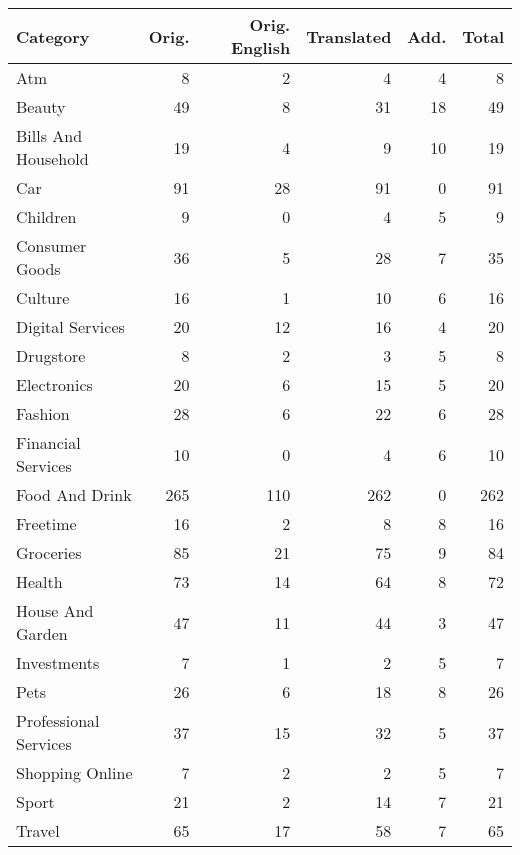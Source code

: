\begin{tabular}{lrrrrr}
\toprule
             Category &  Orig. &  Orig. English &  Translated &  Add. &  Total \\
\midrule
                  Atm &      8 &              2 &           4 &     4 &      8 \\
               Beauty &     49 &              8 &          31 &    18 &     49 \\
  Bills And Household &     19 &              4 &           9 &    10 &     19 \\
                  Car &     91 &             28 &          91 &     0 &     91 \\
             Children &      9 &              0 &           4 &     5 &      9 \\
       Consumer Goods &     36 &              5 &          28 &     7 &     35 \\
              Culture &     16 &              1 &          10 &     6 &     16 \\
     Digital Services &     20 &             12 &          16 &     4 &     20 \\
            Drugstore &      8 &              2 &           3 &     5 &      8 \\
          Electronics &     20 &              6 &          15 &     5 &     20 \\
              Fashion &     28 &              6 &          22 &     6 &     28 \\
   Financial Services &     10 &              0 &           4 &     6 &     10 \\
       Food And Drink &    265 &            110 &         262 &     0 &    262 \\
             Freetime &     16 &              2 &           8 &     8 &     16 \\
            Groceries &     85 &             21 &          75 &     9 &     84 \\
               Health &     73 &             14 &          64 &     8 &     72 \\
     House And Garden &     47 &             11 &          44 &     3 &     47 \\
          Investments &      7 &              1 &           2 &     5 &      7 \\
                 Pets &     26 &              6 &          18 &     8 &     26 \\
Professional Services &     37 &             15 &          32 &     5 &     37 \\
      Shopping Online &      7 &              2 &           2 &     5 &      7 \\
                Sport &     21 &              2 &          14 &     7 &     21 \\
               Travel &     65 &             17 &          58 &     7 &     65 \\
\bottomrule
\end{tabular}
